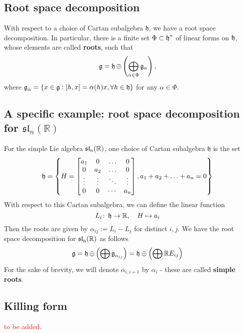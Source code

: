 \subsection{Root space decomposition}
With respect to a choice of Cartan subalgebra $\mathfrak{h}$, we have a root space decomposition. In particular, there is a finite set
$\Phi \subset \operatorname{\mathfrak{h}}^{*}$ of linear forms on $\operatorname{\mathfrak{h}}$, whose elements are called \textbf{roots}, such that
\[\operatorname{\mathfrak{g}} = \operatorname{\mathfrak{h}} \oplus \left(\bigoplus_{\alpha \in \Phi} \mathfrak{g}_\alpha\right),\]
where $\operatorname{\mathfrak{g}}_\alpha = \left\lbrace x \in \operatorname{\mathfrak{g}}: [h,x] = \alpha(h)x, \forall h \in \operatorname{\mathfrak{h}}\right\rbrace$ for any $\alpha \in \Phi$.
\subsection{A specific example: root space decomposition for $\mathfrak{sl}_n(\mathbb{R})$}
For the simple Lie algebra $\operatorname{\mathfrak{sl}_n(\mathbb{R})}$, one choice of  Cartan subalgebra $\mathfrak{h}$ is the set
\[\operatorname{\mathfrak{h}} = \left\lbrace H= \begin{bmatrix}
        a_1    & 0      & \ldots & 0      \\
        0      & a_2    & \ldots & 0      \\
        \vdots & \vdots & \ddots & \vdots \\
        0      & 0      & \cdots & a_n
    \end{bmatrix}, a_1 + a_2+ \ldots + a_n = 0\right\rbrace\]
With respect to this Cartan subalgebra, we can define the linear function
\[L_i \colon \operatorname{\mathfrak{h}} \to \mathbb{R}, \quad H \mapsto  a_i\]
Then the roots are given by $\alpha_{ij} :=L_i - L_j$ for distinct $i,j$. We have the root space decomposition for $\operatorname{\mathfrak{sl}_n(\mathbb{R})}$ as follows
\[\operatorname{\mathfrak{g}} = \operatorname{\mathfrak{h}} \oplus \left(\bigoplus\operatorname{\mathfrak{g}}_{\alpha_{ij}}\right) = \mathfrak{h}\oplus \left(\bigoplus \mathbb{R}E_{ij}\right)\]
For the sake of brevity, we will denote $\alpha_{i,i+1}$ by $\alpha_i$ - these are called \textbf{simple roots}.
\subsection{Killing form}
\textcolor{red}{to be added}.
